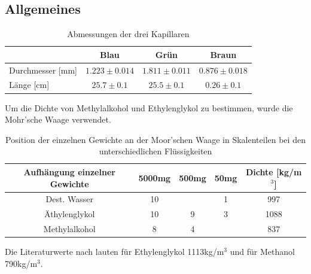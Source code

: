 \documentclass[12pt,a4paper,titlepage,headinclude,bibtotoc]{scrartcl}
\begin{document}
\subsection{Allgemeines}
\begin{table}[!h]
\centering
\begin{tabular}{|l|c|c|c|}
\hline
 & Blau & Grün & Braun\\\hline
Durchmesser [mm]&$1.223\pm 0.014$&$1.811\pm 0.011$&$0.876\pm 0.018$\\\hline
Länge [cm]&$25.7\pm 0.1$&$ 25.5\pm 0.1$&$0.26\pm 0.1$\\\hline
\end{tabular}
\caption{Abmessungen der drei Kapillaren}
\end{table}
Um die Dichte von Methylalkohol und Ethylenglykol zu bestimmen, wurde die Mohr'sche Waage verwendet.
\begin{table}
\centering
\begin{tabular}{|c|c|c|c|c|}
\hline Aufhängung einzelner Gewichte & 5000mg & 500mg & 50mg &Dichte [kg/m$^3$]\\
\hline Dest. Wasser  & 10	&	& 1	& 997	\\
\hline Äthylenglykol & 10	& 9	& 3	& 1088	\\
\hline Methylalkohol & 8	& 4	& 	& 837	\\\hline
\end{tabular}
\caption{Position der einzelnen Gewichte an der Moor'schen Waage in Skalenteilen bei den unterschiedlichen Flüssigkeiten\label{tab:dichte}}
\end{table}
Die Literaturwerte nach \cite[S. 130-131]{Formelsammlung} lauten für Ethylenglykol 1113kg/m$^3$ und für Methanol 790kg/m$^3$.
\end{document}
